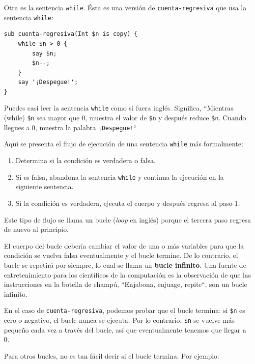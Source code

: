 Otra es la sentencia {\tt while}. Ésta es una versión de 
{\tt cuenta-regresiva} que usa la sentencia {\tt while}:

\begin{lstlisting}
sub cuenta-regresiva(Int $n is copy) {
    while $n > 0 {
        say $n;
        $n--;
    }
    say '¡Despegue!';
}
\end{lstlisting}
%
Puedes casi leer la sentencia {\tt while} como si fuera inglés.
Significa, ``Mientras (while) {\tt \$n} sea mayor que 0,
muestra el valor de {\tt \$n} y después reduce {\tt \$n}. Cuando 
llegues a 0, muestra la palabra {\tt ¡Despegue!}``

Aquí se presenta el flujo de ejecución de una sentencia {\tt while}
más formalmente:

\begin{enumerate}

\item Determina si la condición es verdadera o falsa.

\item Si es falsa, abandona la sentencia {\tt while}
y continua la ejecución en la siguiente sentencia.

\item Si la condición es verdadera, ejecuta el cuerpo y
después regresa al paso 1.

\end{enumerate}

Este tipo de flujo se llama un bucle (\emph{loop} en inglés)
porque el tercera paso regresa de nuevo al principio. 

El cuerpo del bucle debería cambiar el valor de una o más variables
para que la condición se vuelva falsa eventualmente y el bucle
termine. De lo contrario, el bucle se repetirá por siempre, lo cual 
se llama un {\bf bucle infinito}. Una fuente de entretenimiento para
los científicos de la computación es la observación de que las instrucciones
en la botella de champú, ``Enjabona, enjuage, repite``, son un bucle 
infinito.

En el caso de {\tt cuenta-regresiva}, podemos probar que el bucle
termina: si {\tt \$n} es cero o negativo, el bucle nunca se ejecuta.
Por lo contrario, {\tt \$n} se vuelve más pequeño cada vez a través del
bucle, así que eventualmente tenemos que llegar a 0.

Para otros bucles, no es tan fácil decir si el bucle termina. Por ejemplo:

